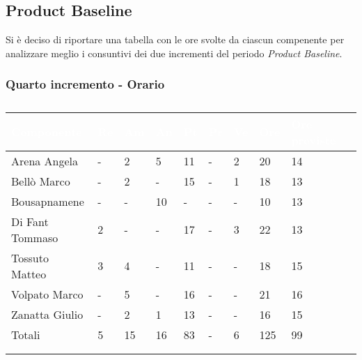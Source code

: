     \subsection{Product Baseline} {
        Si è deciso di riportare una tabella con le ore svolte da ciascun compenente per analizzare meglio 
        i consuntivi dei due incrementi del periodo \textit{Product Baseline}.
        \subsubsection{Quarto incremento - Orario} {
            \setlength{\freewidth}{\dimexpr\textwidth-30\tabcolsep}
            \renewcommand{\arraystretch}{1.0}
            \setlength{\aboverulesep}{0pt}
            \setlength{\belowrulesep}{0pt}
            \begin{longtable}{C{.3\freewidth} C{.1\freewidth} C{.1\freewidth} C{.1\freewidth} C{.1\freewidth} C{.1\freewidth} C{.1\freewidth} C{.1\freewidth} C{.1\freewidth} C{.3\freewidth}}
            \toprule
            \textcolor{white}{\textbf{Componente}}&
            \textcolor{white}{\textbf{Re}}&
            \textcolor{white}{\textbf{Am}}&
            \textcolor{white}{\textbf{An}}&
            \textcolor{white}{\textbf{Pt}}&
            \textcolor{white}{\textbf{Pr}}&
            \textcolor{white}{\textbf{Ve}}&
            \textcolor{white}{\textbf{Ore}}&
            \textcolor{white}{\textbf{Ore previste}} \\
            \toprule
            \endhead
    
            Arena Angela & - & 2 & 5 & 11 & - & 2 & 20 & 14\\      
            Bellò Marco & - & 2 & - & 15 & - & 1 & 18 & 13\\      
            Bousapnamene & - & - & 10 & - & - & - & 10 & 13\\      
            Di Fant Tommaso & 2 & - & - & 17 & - & 3 & 22 & 13\\      
            Tossuto Matteo & 3 & 4 & - & 11 & - & - & 18 & 15\\      
            Volpato Marco & - & 5 & - & 16 & - & - & 21 & 16 \\      
            Zanatta Giulio & - & 2 & 1 & 13 & - & - & 16 & 15 \\      
            Totali & 5 & 15 & 16 & 83 & - & 6 & 125 & 99 \\
            \bottomrule
            \\
            \caption{}
    

\end{longtable}}}
